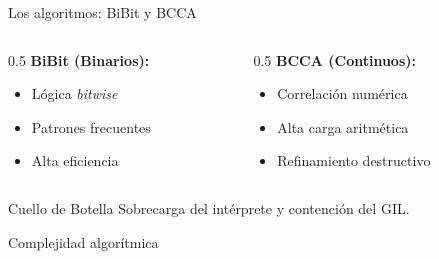 \documentclass[10pt,aspectratio=169]{beamer}
\begin{document}
\begin{frame}{Los algoritmos: BiBit y BCCA}
    \begin{columns}
        \begin{column}{0.5\textwidth}
            \textbf{BiBit (Binarios):}
            \begin{itemize}
                \item Lógica \textit{bitwise}
                \item Patrones frecuentes
                \item Alta eficiencia
            \end{itemize}
        \end{column}
        \begin{column}{0.5\textwidth}
            \textbf{BCCA (Continuos):}
            \begin{itemize}
                \item Correlación numérica
                \item Alta carga aritmética
                \item Refinamiento destructivo
            \end{itemize}
        \end{column}
    \end{columns}
    \vspace{0.4cm}
    \begin{alertblock}{Cuello de Botella}
        Sobrecarga del intérprete y contención del GIL.
    \end{alertblock}
\end{frame}

\begin{frame}{Complejidad algorítmica}
    \begin{table}
        \centering
        \renewcommand{\arraystretch}{1.5}
    \end{table}
\end{frame}
\end{document}
